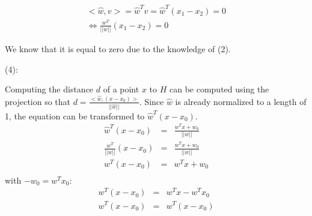 \documentclass{article}
\begin{document}
\begin{eqnarray}
<\hat{w}, v> = \hat{w}^T v = \hat{w}^T (x_1-x_2) = 0\\
\Leftrightarrow \frac{w^T}{||w||}(x_1-x_2) = 0
\end{eqnarray}

We know that it is equal to zero due to the knowledge of (2).

(4):

Computing the distance $d$ of a point $x$ to $H$ can be computed using the projection so that $d = \frac{<\hat{w},(x-x_0)>}{||\hat{w}||}$. Since $\hat{w}$ is already normalized to a length of 1, the equation can be transformed to $\hat{w}^T (x-x_0)$.
\begin{eqnarray}
\hat{w}^T(x-x_0) &=& \frac{w^Tx+w_0}{||w||}\\
\frac{w^T}{||w||}(x-x_0) &=& \frac{w^Tx+w_0}{||w||}\\
w^T(x-x_0) &=& w^Tx+w_0\\
\end{eqnarray}
with $-w_0 = w^Tx_0$:
\begin{eqnarray}
w^T (x-x_0) &=& w^Tx -w^T x_0\\
w^T (x-x_0) &=& w^T (x-x_0)
\end{eqnarray}
\end{document}
